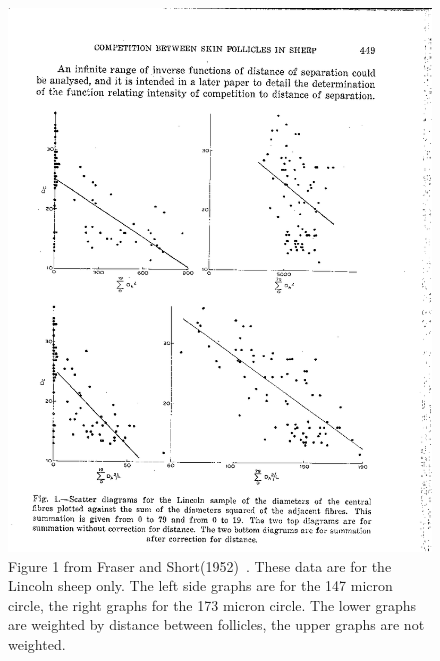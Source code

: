%

\begin{figure}[!h]
  \centering
   \includegraphics[width=1.0\textwidth]{frasershort.png}
  \caption{Figure 1 from Fraser and Short(1952)~\cite{fras:52}. These data are for the Lincoln sheep only. The left side graphs are for the 147 micron circle, the right graphs for the 173 micron circle. The lower graphs are weighted by distance between follicles, the upper graphs are not weighted. }
  \label{fig:frasershort}
\end{figure}

%

